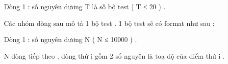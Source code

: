 Dòng 1 : số nguyên dương T là số bộ test ( T ≤ 20 ) .   


   Các nhóm dòng sau mô tả 1 bộ test . 1 bộ test sẽ có format như sau :   


   Dòng 1 : số nguyên dương N (  N ≤ 10000 ) .   


   N dòng tiếp theo , dòng thứ i gồm 2 số nguyên là toạ độ của điểm thứ i .